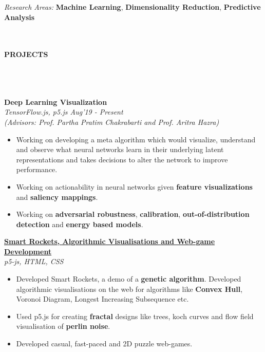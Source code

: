\documentclass[a4,10pt]{book}
\newcommand{\lsep}{-0.57cm}
\newcommand{\psep}{-0.6cm}
\newcommand{\resheading}[1]{{\small \colorbox{mygrey}{\begin{minipage}{0.975\textwidth}{\textbf{#1 \vphantom{p\^{E}}}}\end{minipage}}}}
\begin{document}
\emph{Research Areas:}  \textbf{Machine Learning}, \textbf{Dimensionality Reduction},  \textbf{Predictive}  \textbf{Analysis}
\\
\hspace{0cm}\\[-0.5cm]\\
\resheading{\textbf{ PROJECTS } }\\[\lsep]
\\\\ \large \textbf{Deep Learning Visualization} \normalsize\\
\emph{TensorFlow.js, p5.js \hfill Aug'19 - Present} \\ 
\emph{(Advisors: Prof. Partha Pratim Chakrabarti and Prof. Aritra Hazra)} \\[\lsep]
\begin{itemize}
	\item Working on developing a meta algorithm which would visualize, understand and observe what neural networks learn in their underlying latent representations and takes decisions to alter the network to improve performance.\\[\psep]
	\item Working on actionability in neural networks given \textbf{feature visualizations} and \textbf{saliency mappings}.\\[\psep]
	\item Working on \textbf{adversarial robustness}, \textbf{calibration}, \textbf{out-of-distribution detection} and \textbf{energy based models}.
	\\
\end{itemize}
\large \href{http://cse.iitkgp.ac.in/~arastogi}{\textbf{Smart Rockets, Algorithmic Visualisations and Web-game Development}} \normalsize\\
\emph{p5-js, HTML, CSS} \\[\lsep]
\begin{itemize}
	\item Developed Smart Rockets, a demo of a \textbf{genetic algorithm}. Developed algorithmic visualisations on the web for algorithms like \textbf{Convex Hull}, Voronoi Diagram, Longest Increasing Subsequence etc.
	\\[\psep]
	\item  Used p5.js for creating \textbf{fractal} designs like trees, koch curves and flow field visualisation of \textbf{perlin noise}.\\[\psep]
	\item  Developed casual, fast-paced and 2D puzzle web-games.\\[\lsep]
\end{itemize}
\end{document}
